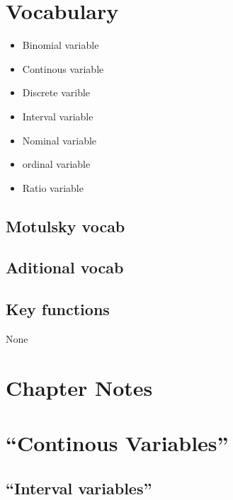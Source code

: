 \documentclass[]{book}
\providecommand{\tightlist}{%
  \setlength{\itemsep}{0pt}\setlength{\parskip}{0pt}}
\theoremstyle{definition}
\theoremstyle{definition}
\theoremstyle{definition}
\theoremstyle{remark}
\begin{document}
\section*{Vocabulary}\label{vocabulary-7}

\begin{itemize}
\tightlist
\item
  Binomial variable
\item
  Continous variable
\item
  Discrete varible
\item
  Interval variable
\item
  Nominal variable
\item
  ordinal variable
\item
  Ratio variable
\end{itemize}

\subsection{Motulsky vocab}\label{motulsky-vocab-7}

\subsection{Aditional vocab}\label{aditional-vocab-4}

\subsection{Key functions}\label{key-functions-6}

None

\section*{Chapter Notes}\label{chapter-notes-7}

\section{\texorpdfstring{``Continous
Variables''}{Continous Variables}}\label{continous-variables}

\subsection{\texorpdfstring{``Interval
variables''}{Interval variables}}\label{interval-variables}
\end{document}
